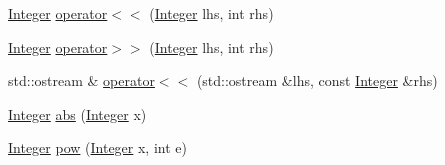 \begin{DoxyCompactItemize}
\item 
\hyperlink{classInteger}{Integer} \hyperlink{classInteger_aaf32bc4191034ed250a064aa6796ade5}{operator$<$$<$} (\hyperlink{classInteger}{Integer} lhs, int rhs)
\item 
\hyperlink{classInteger}{Integer} \hyperlink{classInteger_a06b0180ba9f20ffd4401155763a03119}{operator$>$$>$} (\hyperlink{classInteger}{Integer} lhs, int rhs)
\item 
std\-::ostream \& \hyperlink{classInteger_a76099b70bb34d31b3874482f89e24ccd}{operator$<$$<$} (std\-::ostream \&lhs, const \hyperlink{classInteger}{Integer} \&rhs)
\item 
\hyperlink{classInteger}{Integer} \hyperlink{classInteger_ac872a9e1c5a2e8e1457baf75e439f8da}{abs} (\hyperlink{classInteger}{Integer} x)
\item 
\hyperlink{classInteger}{Integer} \hyperlink{classInteger_a952b384ed1bfaf53196af505c20ca8d8}{pow} (\hyperlink{classInteger}{Integer} x, int e)
\end{DoxyCompactItemize}



